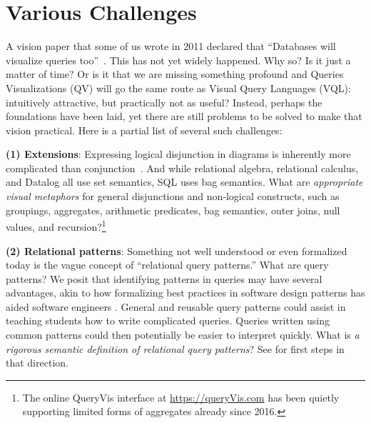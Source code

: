 \documentclass[letterpaper,11pt]{article}
\newcommand{\queryvis}{\textsf{QueryVis}\xspace}
\begin{document}















%
%
%
%
%
%
%










\section{Various Challenges} 


A vision paper that some of us wrote in 2011 declared that ``Databases will visualize queries too''~\cite{gatterbauer2011databases}.
This has not yet widely happened.
Why so? Is it just a matter of time?  Or is it that we are missing something profound and Queries Visualizations (QV) will go the same route as Visual Query Languages (VQL):
intuitively attractive, but practically not as useful?
%
Instead, perhaps the foundations have been laid, yet there are still problems to be solved
to make that vision practical.
Here is a partial list of several such challenges:

%



\textbf{(1) Extensions}:
Expressing logical disjunction in diagrams is inherently more complicated than conjunction~\cite{Shin:2002}.
And while relational algebra, relational calculus, and Datalog all use set semantics, SQL uses bag semantics.
What are \emph{appropriate visual metaphors} for 
general disjunctions 
and non-logical constructs, such as 
groupings, aggregates, arithmetic predicates, bag semantics, outer joins, null values, and recursion?\footnote{The online \queryvis interface at \url{https://queryVis.com} has been quietly supporting limited forms of aggregates already since 2016.}



\textbf{(2) Relational patterns}:
Something not well understood or even formalized today is the vague concept of ``relational query patterns.''
What are query patterns?
We posit that identifying patterns in queries may have several advantages, 
akin to how formalizing best practices in software design patterns has aided software engineers \cite{Gamma:1995ys}.
General and reusable query patterns could assist in teaching students how to write complicated queries.
Queries written using common patterns could then potentially be easier to interpret quickly.
What is \emph{a rigorous semantic definition of relational query patterns}?
See \cite{relationalDiagrams} for first steps in that direction.
\end{document}
